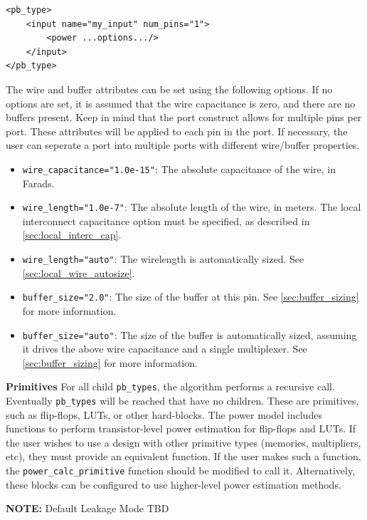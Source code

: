 \documentclass[letterpaper,twoside,10pt]{article}
\begin{document}
\begin{BVerbatim}[bgcolor=LightGray, boxwidth=\textwidth] 
<pb_type>
	<input name="my_input" num_pins="1">
		<power ...options.../>
	</input>
</pb_type>
\end{BVerbatim}

The wire and buffer attributes can be set using the following options.  If no options are set, it is assumed that the wire capacitance is zero, and there are no buffers present.  Keep in mind that the port construct allows for multiple pins per port.  These attributes will be applied to each pin in the port.  If necessary, the user can seperate a port into multiple ports with different wire/buffer properties.
\begin{itemize}
	\item \texttt{wire\_capacitance="1.0e-15"}: The absolute capacitance of the wire, in Farads.
	\item \texttt{wire\_length="1.0e-7"}: The absolute length of the wire, in meters.  The local interconnect capacitance option must be specified, as described in \autoref{sec:local_interc_cap}.
	\item \texttt{wire\_length="auto"}: The wirelength is automatically sized.  See \autoref{sec:local_wire_autosize}.
	\item \texttt{buffer\_size="2.0"}: The size of the buffer at this pin.  See \autoref{sec:buffer_sizing} for more information.
	\item \texttt{buffer\_size="auto"}: The size of the buffer is automatically sized, assuming it drives the above wire capacitance and a single multiplexer.  
	See \autoref{sec:buffer_sizing} for more information.
\end{itemize}

\textbf{Primitives}
For all child \texttt{pb\_types}, the algorithm performs a recursive call. Eventually \texttt{pb\_types} will be reached that have no children.  
These are primitives, such as flip-flops, LUTs, or other hard-blocks.  The power model includes functions to perform transistor-level power estimation for flip-flops and LUTs. 
If the user wishes to use a design with other primitive types (memories, multipliers, etc), they must provide an equivalent function.  If the user makes such a function, the \texttt{power\_calc\_primitive} function should be modified to call it.  Alternatively, these blocks can be configured to use higher-level power estimation methods.

\textbf{NOTE:} Default Leakage Mode TBD
\end{document}
